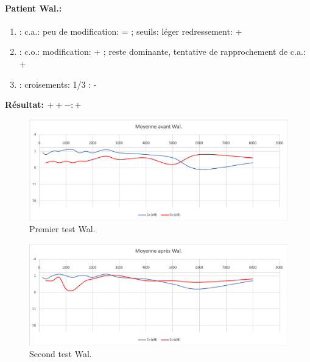  \clearpage

\paragraph{ Patient Wal.:}


	\begin{enumerate}

 		\item : c.a.: peu de modification: = ;  seuils: léger redressement: +

 		\item : c.o.:  modification:  + ; reste dominante, tentative de rapprochement de c.a.: +
 		\item : croisements: 1/3 :  -

                \end{enumerate}

                \textbf{ Résultat:  $ + +  -        : +$ }
\begin{figure}[th]
	\centering
	\includegraphics[width=1\linewidth]{images/graphiques/wal_pre.png}
	\caption[Patient Wal. :1° test]{Premier test Wal.}
	
\end{figure}
               \begin{figure}%
\centering
\includegraphics[width=1\linewidth]{images/graphiques/wal_post.png}
\caption[Patient Wal. : 2° test]{Second test Wal.}

\label{groupecontroleimage1}
\end{figure}




